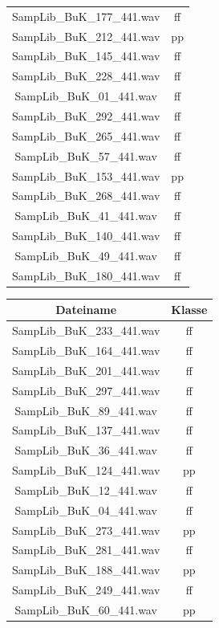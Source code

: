 \begin{table}[H]
\begin{minipage}[b]{0.4\textwidth}
\begin{tabular}{ | c | c | }
    SampLib\_BuK\_177\_441.wav & ff \\
    SampLib\_BuK\_212\_441.wav & pp \\
    SampLib\_BuK\_145\_441.wav & ff \\
    SampLib\_BuK\_228\_441.wav & ff \\
    SampLib\_BuK\_01\_441.wav & ff \\
    SampLib\_BuK\_292\_441.wav & ff \\
    SampLib\_BuK\_265\_441.wav & ff \\
    SampLib\_BuK\_57\_441.wav & ff \\
    SampLib\_BuK\_153\_441.wav & pp \\
    SampLib\_BuK\_268\_441.wav & ff \\
    SampLib\_BuK\_41\_441.wav & ff \\
    SampLib\_BuK\_140\_441.wav & ff \\
    SampLib\_BuK\_49\_441.wav & ff \\
    SampLib\_BuK\_180\_441.wav & ff \\
    \hline
  \end{tabular}
\end{minipage}
\hfill
\begin{minipage}[b]{0.4\textwidth}
  \begin{tabular}{ | c | c | }
    \hline
    Dateiname & Klasse \\
    \hline
    SampLib\_BuK\_233\_441.wav & ff \\
    SampLib\_BuK\_164\_441.wav & ff \\
    SampLib\_BuK\_201\_441.wav & ff \\
    SampLib\_BuK\_297\_441.wav & ff \\
    SampLib\_BuK\_89\_441.wav & ff \\
    SampLib\_BuK\_137\_441.wav & ff \\
    SampLib\_BuK\_36\_441.wav & ff \\
    SampLib\_BuK\_124\_441.wav & pp \\
    SampLib\_BuK\_12\_441.wav & ff \\
    SampLib\_BuK\_04\_441.wav & ff \\
    SampLib\_BuK\_273\_441.wav & pp \\
    SampLib\_BuK\_281\_441.wav & ff \\
    SampLib\_BuK\_188\_441.wav & pp \\
    SampLib\_BuK\_249\_441.wav & ff \\
    SampLib\_BuK\_60\_441.wav & pp \\

\end{tabular}
\end{minipage}
\end{table}
